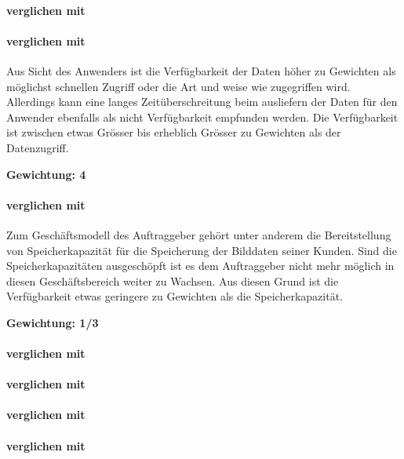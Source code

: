 \paragraph*{ verglichen mit }

\paragraph*{ verglichen mit }
Aus Sicht des Anwenders ist die Verfügbarkeit der Daten höher zu Gewichten als möglichst schnellen Zugriff oder die Art und weise wie zugegriffen wird. Allerdings kann eine langes Zeitüberschreitung beim ausliefern der Daten für den Anwender ebenfalls als nicht Verfügbarkeit empfunden werden. Die Verfügbarkeit ist zwischen etwas Grösser bis erheblich Grösser zu Gewichten als der Datenzugriff.

\textbf{Gewichtung: 4}

\paragraph*{ verglichen mit }
Zum Geschäftsmodell des Auftraggeber gehört unter anderem die Bereitstellung von Speicherkapazität für die Speicherung der Bilddaten seiner Kunden. Sind die Speicherkapazitäten ausgeschöpft ist es dem Auftraggeber nicht mehr möglich in diesen Geschäftsbereich weiter zu Wachsen. Aus diesen Grund ist die Verfügbarkeit etwas geringere zu Gewichten als die Speicherkapazität.

\textbf{Gewichtung: 1/3}


\paragraph*{ verglichen mit }

\paragraph*{ verglichen mit }


\paragraph*{ verglichen mit }

\paragraph*{ verglichen mit }

